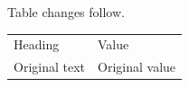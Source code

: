 \documentclass{article}
\begin{document}
Table changes follow.
\begin{tabular}{p{.45\linewidth}p{.45\linewidth}}
Heading & Value \\
Original text & Original value \\
\end{tabular}
\end{document}
